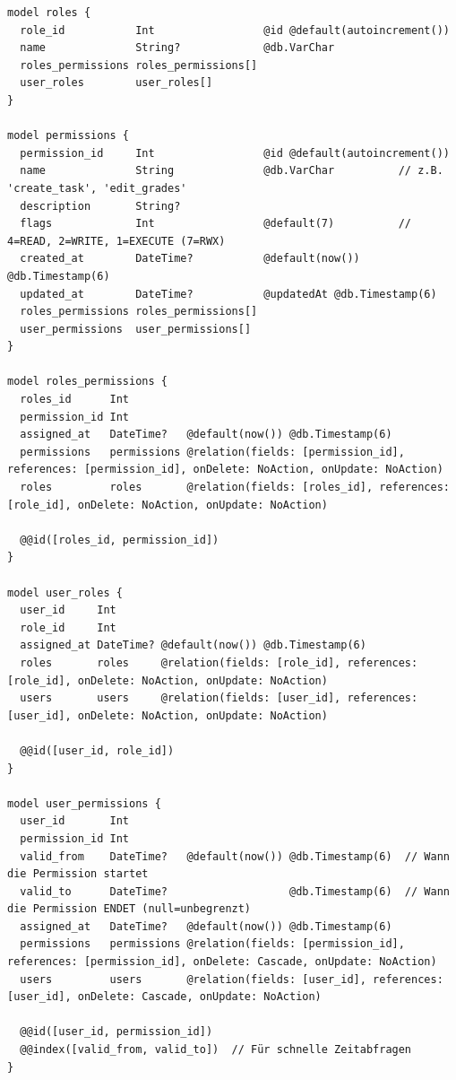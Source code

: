 \begin{listing}[H]
\begin{verbatim}
model roles {
  role_id           Int                 @id @default(autoincrement())
  name              String?             @db.VarChar
  roles_permissions roles_permissions[]
  user_roles        user_roles[]
}

model permissions {
  permission_id     Int                 @id @default(autoincrement())
  name              String              @db.VarChar          // z.B. 'create_task', 'edit_grades'
  description       String?
  flags             Int                 @default(7)          // 4=READ, 2=WRITE, 1=EXECUTE (7=RWX)
  created_at        DateTime?           @default(now()) @db.Timestamp(6)
  updated_at        DateTime?           @updatedAt @db.Timestamp(6)
  roles_permissions roles_permissions[]
  user_permissions  user_permissions[]
}

model roles_permissions {
  roles_id      Int
  permission_id Int
  assigned_at   DateTime?   @default(now()) @db.Timestamp(6)
  permissions   permissions @relation(fields: [permission_id], references: [permission_id], onDelete: NoAction, onUpdate: NoAction)
  roles         roles       @relation(fields: [roles_id], references: [role_id], onDelete: NoAction, onUpdate: NoAction)

  @@id([roles_id, permission_id])
}

model user_roles {
  user_id     Int
  role_id     Int
  assigned_at DateTime? @default(now()) @db.Timestamp(6)
  roles       roles     @relation(fields: [role_id], references: [role_id], onDelete: NoAction, onUpdate: NoAction)
  users       users     @relation(fields: [user_id], references: [user_id], onDelete: NoAction, onUpdate: NoAction)

  @@id([user_id, role_id])
}

model user_permissions {
  user_id       Int
  permission_id Int
  valid_from    DateTime?   @default(now()) @db.Timestamp(6)  // Wann die Permission startet
  valid_to      DateTime?                   @db.Timestamp(6)  // Wann die Permission ENDET (null=unbegrenzt)
  assigned_at   DateTime?   @default(now()) @db.Timestamp(6)
  permissions   permissions @relation(fields: [permission_id], references: [permission_id], onDelete: Cascade, onUpdate: NoAction)
  users         users       @relation(fields: [user_id], references: [user_id], onDelete: Cascade, onUpdate: NoAction)

  @@id([user_id, permission_id])
  @@index([valid_from, valid_to])  // Für schnelle Zeitabfragen
}
\end{verbatim}
\caption{Prisma -- Rollen- und Berechtigungsmodelle (RBAC)}
\label{lst:prisma_rbac}
\end{listing}

